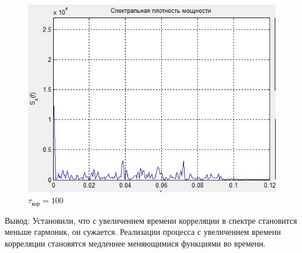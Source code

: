 \begin{figure}[H]
\begin{minipage}{0.3\linewidth}
        \includegraphics[width=\linewidth]{fig/realize10_sp.jpg}
		\caption*{$\tau_\text{кор}=100$}
	\end{minipage}
\end{figure}
Вывод: Установили, что с увеличением времени корреляции в спектре становится меньше гармоник, он сужается. Реализации процесса с увеличением времени корреляции становятся медленнее меняющимися функциями во времени.

